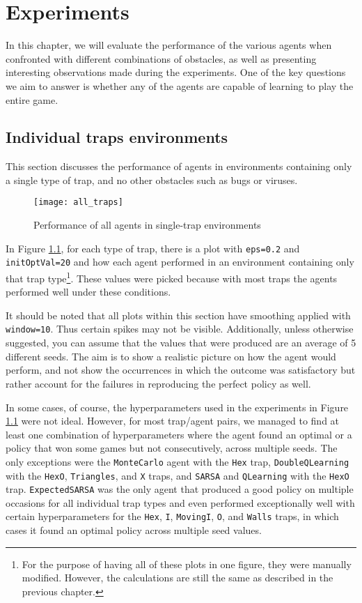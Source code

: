 \chapter{Experiments}
\label{experiments_chapter}
In this chapter, we will evaluate the performance of the various agents when confronted with different combinations of obstacles, as well as presenting interesting observations made during the experiments. One of the key questions we aim to answer is whether any of the agents are capable of learning to play the entire game.

\section{Individual traps environments}
This section discusses the performance of agents in environments containing only a single type of trap, and no other obstacles such as bugs or viruses.

\begin{figure}[h]
    \centering
    \texttt{[image: all\_traps]}
    \caption{Performance of all agents in single-trap environments}
    \label{fig:all_traps}
\end{figure}

In Figure \ref{fig:all_traps}, for each type of trap, there is a plot with \texttt{eps=0.2} and \texttt{initOptVal=20} and how each agent performed in an environment containing only that trap type\footnote{For the purpose of having all of these plots in one figure, they were manually modified. However, the calculations are still the same as described in the previous chapter.}. These values were picked because with most traps the agents performed well under these conditions.

It should be noted that all plots within this section have smoothing applied with \texttt{window=10}. Thus certain spikes may not be visible. Additionally, unless otherwise suggested, you can assume that the values that were produced are an average of 5 different seeds. The aim is to show a realistic picture on how the agent would perform, and not show the occurrences in which the outcome was satisfactory but rather account for the failures in reproducing the perfect policy as well.

In some cases, of course, the hyperparameters used in the experiments in Figure \ref{fig:all_traps} were not ideal. However, for most trap/agent pairs, we managed to find at least one combination of hyperparameters where the agent found an optimal or a policy that won some games but not consecutively, across multiple seeds. The only exceptions were the \texttt{MonteCarlo} agent with the \texttt{Hex} trap, \texttt{DoubleQLearning} with the \texttt{HexO}, \texttt{Triangles}, and \texttt{X} traps, and \texttt{SARSA} and \texttt{QLearning} with the \texttt{HexO} trap. \texttt{ExpectedSARSA} was the only agent that produced a good policy on multiple occasions for all individual trap types and even performed exceptionally well with certain hyperparameters for the \texttt{Hex}, \texttt{I}, \texttt{MovingI}, \texttt{O}, and \texttt{Walls} traps, in which cases it found an optimal policy across multiple seed values.

